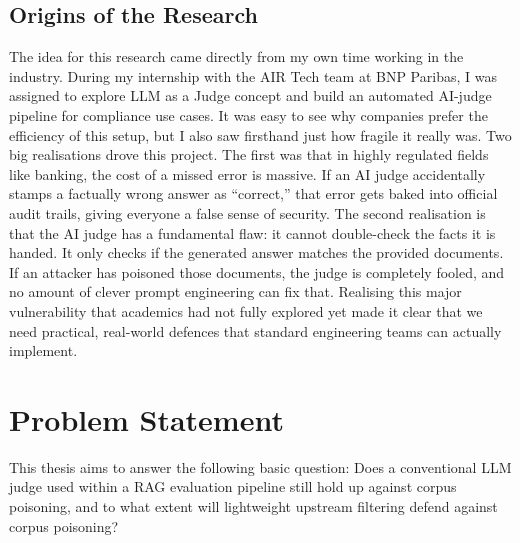 \subsection{Origins of the Research}

The idea for this research came directly from my own time working in the industry. During my internship with the AIR Tech team at BNP Paribas, I was assigned to explore LLM as a Judge concept and build an automated AI-judge pipeline for compliance use cases. It was easy to see why companies prefer the efficiency of this setup, but I also saw firsthand just how fragile it really was.
Two big realisations drove this project. The first was that in highly regulated fields like banking, the cost of a missed error is massive. If an AI judge accidentally stamps a factually wrong answer as ``correct,'' that error gets baked into official audit trails, giving everyone a false sense of security.
The second realisation is that the AI judge has a fundamental flaw: it cannot double-check the facts it is handed. It only checks if the generated answer matches the provided documents. If an attacker has poisoned those documents, the judge is completely fooled, and no amount of clever prompt engineering can fix that.
Realising this major vulnerability that academics had not fully explored yet made it clear that we need practical, real-world defences that standard engineering teams can actually implement.

\section{Problem Statement}

This thesis aims to answer the following basic question: Does a conventional LLM judge used within a RAG evaluation pipeline still hold up against corpus poisoning, and to what extent will lightweight upstream filtering defend against corpus poisoning?

